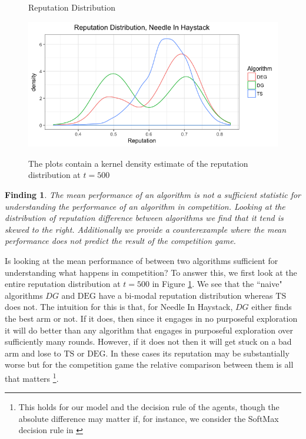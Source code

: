 \documentclass[letterpaper]{article}
\theoremstyle{definition}
\newtheorem{finding}{Finding}
\newcommand{\TS}{\mathrm{TS}}
\newcommand{\DEG}{\mathrm{DEG}}
\begin{document}
\begin{figure}[H]
\caption{Reputation Distribution}
\includegraphics[scale=0.35]{figures/rep_distribution_nih}
\label{rep_dist_nih}
\caption*{\tiny{The plots contain a kernel density estimate of the reputation distribution at $t = 500$}}
\end{figure}

\begin{finding}
\textit{The mean performance of an algorithm is not a sufficient statistic for understanding the performance of an algorithm in competition. Looking at the distribution of reputation difference between algorithms we find that it tend is skewed to the right. Additionally we provide a counterexample where the mean performance does not predict the result of the competition game.}
\end{finding}


Is looking at the mean performance of between two algorithms sufficient for understanding what happens in competition? To answer this, we first look at the entire reputation distribution at $t = 500$ in Figure \ref{rep_dist_nih}. We see that the ``naive" algorithms $DG$ and $\DEG$ have a bi-modal reputation distribution whereas $\TS$ does not. The intuition for this is that, for Needle In Haystack, $DG$ either finds the best arm or not. If it does, then since it engages in no purposeful exploration it will do better than any algorithm that engages in purposeful exploration over sufficiently many rounds. However, if it does not then it will get stuck on a bad arm and lose to $\TS$ or $\DEG$. In these cases its reputation may be substantially worse but for the competition game the relative comparison between them is all that matters \footnote{This holds for our model and the decision rule of the agents, though the absolute difference may matter if, for instance, we consider the SoftMax decision rule in \cite{CompetingBandits-itcs16}}.
\end{document}
